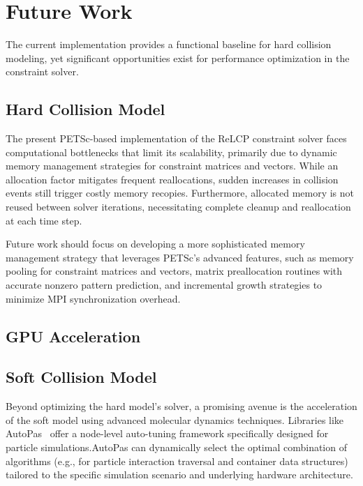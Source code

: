 \documentclass[conference]{IEEEtran}
\begin{document}
\newpage
\section{Future Work}

The current implementation provides a functional baseline for hard collision modeling, yet significant opportunities exist for performance optimization in the constraint solver.

\subsection{Hard Collision Model}
The present PETSc-based implementation of the ReLCP constraint solver faces computational bottlenecks that limit its scalability, primarily due to dynamic memory management strategies for constraint matrices and vectors. While an allocation factor mitigates frequent reallocations, sudden increases in collision events still trigger costly memory recopies. Furthermore, allocated memory is not reused between solver iterations, necessitating complete cleanup and reallocation at each time step.

Future work should focus on developing a more sophisticated memory management strategy that leverages PETSc's advanced features, such as memory pooling for constraint matrices and vectors, matrix preallocation routines with accurate nonzero pattern prediction, and incremental growth strategies to minimize MPI synchronization overhead.


\subsection{GPU Acceleration}

\cite{Tasora2008}

\subsection{Soft Collision Model}

Beyond optimizing the hard model's solver, a promising avenue is the acceleration of the soft model using advanced molecular dynamics techniques. Libraries like AutoPas~\cite{AutoPasGithub,Gratl2019,Newcome2023} offer a node-level auto-tuning framework specifically designed for particle simulations.AutoPas can dynamically select the optimal combination of algorithms (e.g., for particle interaction traversal and container data structures) tailored to the specific simulation scenario and underlying hardware architecture.
\end{document}
